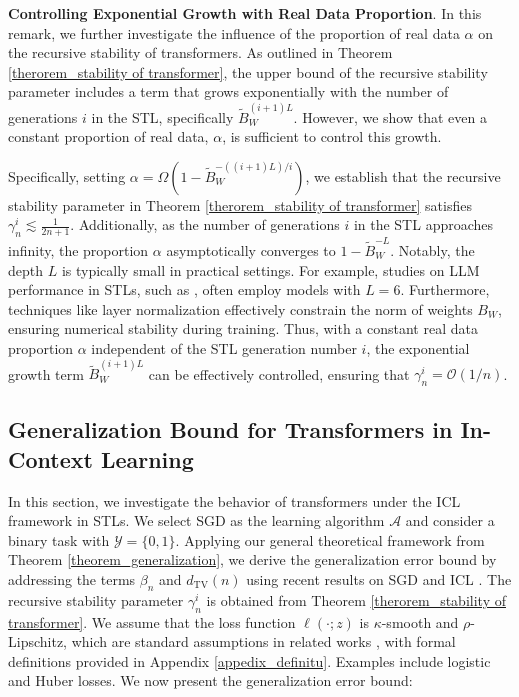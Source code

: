 \begin{remark}\textbf{Controlling Exponential Growth with Real Data Proportion}.\label{remark_stability of transformer} In this remark, we further investigate the influence of the proportion of real data $\alpha$ on the recursive stability of transformers. As outlined in Theorem \ref{therorem_stability of transformer}, the upper bound of the recursive stability parameter includes a term that grows exponentially with the number of generations $i$ in the STL, specifically $\widetilde{B}_W^{(i+1) L}$. However, we show that even a constant proportion of real data, $\alpha$, is sufficient to control this growth.

Specifically, setting $\alpha=\Omega(1-\widetilde{B}_W^{-((i+1) L)/i})$, we establish that the recursive stability parameter in Theorem \ref{therorem_stability of transformer} satisfies $\gamma_n^i \lesssim \frac{1}{2 n+1}$. Additionally, as the number of generations $i$ in the STL approaches infinity, the proportion $\alpha$ asymptotically converges to $1-\widetilde{B}_W^{-L}$. Notably,  the depth \(L\) is typically small in practical settings. For example, studies on LLM performance in STLs, such as \cite{briesch2023large}, often employ models with \(L = 6\). Furthermore, techniques like layer normalization effectively constrain the norm of weights \(B_W\), ensuring numerical stability during training. Thus, with a constant real data proportion $\alpha$ independent of the STL generation number $i$, the exponential growth term $\widetilde{B}_W^{(i+1) L}$ can be effectively controlled, ensuring that $\gamma_n^i=\mathcal{O}(1 / n)$.
    
\end{remark}




\subsection{Generalization Bound for Transformers in In-Context Learning}\label{subsection_tra3}
In this section, we investigate the behavior of transformers under the ICL framework in STLs. We select SGD as the learning algorithm $\mathcal{A}$ and consider a binary task with $\mathcal{Y} = \{0,1\}$. Applying our general theoretical framework from Theorem \ref{theorem_generalization}, we derive the generalization error bound by addressing the terms $\beta_n$ and $d_{\mathrm{TV}}(n)$ using recent results on SGD \citep{zhang2022stability} and ICL \citep{zhang2023and}. The recursive stability parameter $\gamma_n^i$ is obtained from Theorem \ref{therorem_stability of transformer}. We assume that the loss function $\ell(\cdot; z)$ is $\kappa$-smooth and $\rho$-Lipschitz, which are standard assumptions in related works \citep{hardt2016train,lei2020fine}, with formal definitions provided in Appendix \ref{appedix_definitu}. Examples include logistic and Huber losses. We now present the generalization error bound:


